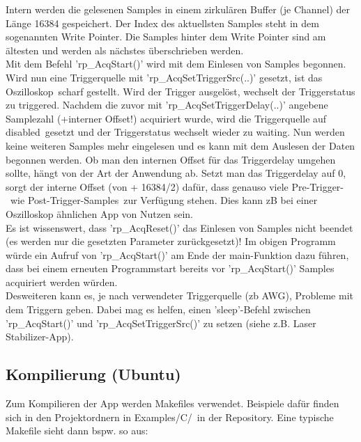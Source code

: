 \documentclass[11pt]{scrartcl}
\begin{document}
Intern werden die gelesenen Samples in einem zirkulären Buffer (je Channel) der Länge 16384 gespeichert. Der Index des aktuellsten Samples steht in dem sogenannten \grqq Write Pointer\grqq. Die Samples hinter dem Write Pointer sind am ältesten und werden als nächstes überschrieben werden.\\
Mit dem Befehl 'rp\_AcqStart()' wird mit dem Einlesen von Samples begonnen. Wird nun eine Triggerquelle mit 'rp\_AcqSetTriggerSrc(..)' gesetzt, ist das \grqq Oszilloskop\grqq~scharf gestellt. Wird der Trigger ausgelöst, wechselt der Triggerstatus zu \grqq triggered\grqq . Nachdem die zuvor mit 'rp\_AcqSetTriggerDelay(..)' angebene Samplezahl (+interner Offset!) acquiriert wurde, wird die Triggerquelle auf \grqq disabled\grqq~gesetzt und der Triggerstatus wechselt wieder zu \grqq waiting\grqq. Nun werden keine weiteren Samples mehr eingelesen und es kann mit dem Auslesen der Daten begonnen werden. Ob man den internen Offset für das Triggerdelay umgehen sollte, hängt von der Art der Anwendung ab. Setzt man das Triggerdelay auf 0, sorgt der interne Offset (von + 16384/2) dafür, dass genauso viele \grqq Pre-Trigger-\grqq~wie \grqq Post-Trigger-Samples\grqq~zur Verfügung stehen. Dies kann zB bei einer Oszilloskop ähnlichen App von Nutzen sein.\\
Es ist wissenswert, dass 'rp\_AcqReset()' das Einlesen von Samples nicht beendet (es werden nur die gesetzten Parameter zurückgesetzt)! Im obigen Programm würde ein Aufruf von 'rp\_AcqStart()' am Ende der main-Funktion dazu führen, dass bei einem erneuten Programmstart bereits vor 'rp\_AcqStart()' Samples acquiriert werden würden.\\ 
Desweiteren kann es, je nach verwendeter Triggerquelle (zb \grqq AWG\grqq), Probleme mit dem Triggern geben. Dabei mag es helfen, einen 'sleep'-Befehl zwischen 'rp\_AcqStart()' und 'rp\_AcqSetTriggerSrc()' zu setzen (siehe z.B. \grqq Laser Stabilizer\grqq -App).

\subsection{Kompilierung (Ubuntu)}
Zum Kompilieren der App werden Makefiles verwendet. Beispiele dafür finden sich in den Projektordnern in \grqq Examples/C/\grqq~in der Repository. Eine typische Makefile sieht dann bspw. so aus:
\end{document}

